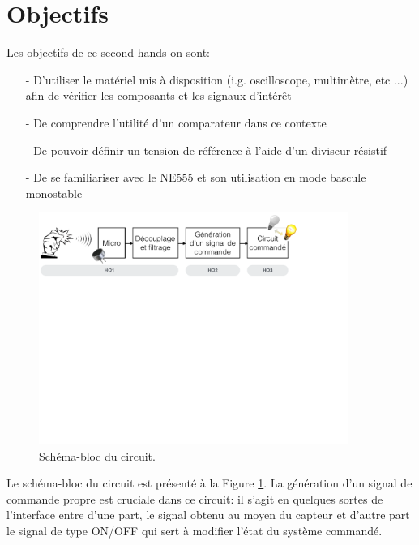 \section{Objectifs}

Les objectifs de ce second hands-on sont:

\begin{itemize}
    \item[-] D'utiliser le matériel mis à disposition (i.g. oscilloscope, multimètre, etc ...) afin de vérifier les composants et les signaux d'intérêt
	\item[-] De comprendre l'utilité d'un comparateur dans ce contexte
	\item[-] De pouvoir définir un tension de référence à l'aide d'un diviseur résistif 
	\item[-] De se familiariser avec le NE555 et son utilisation en mode bascule monostable
	
\end{itemize}

\begin{figure}[!ht]
	\centering
	\includegraphics[width=0.9\textwidth]{figures/SchemaBloc.pdf}
	\caption{Schéma-bloc du circuit.}
	\label{fig:block-diagram}
\end{figure}

Le schéma-bloc du circuit est présenté à la Figure \ref{fig:block-diagram}. La génération d'un signal de commande propre est cruciale dans ce circuit: il s'agit en quelques sortes de l'interface entre d'une part, le signal obtenu au moyen du capteur et d'autre part le signal de type ON/OFF qui sert à modifier l'état du système commandé. 